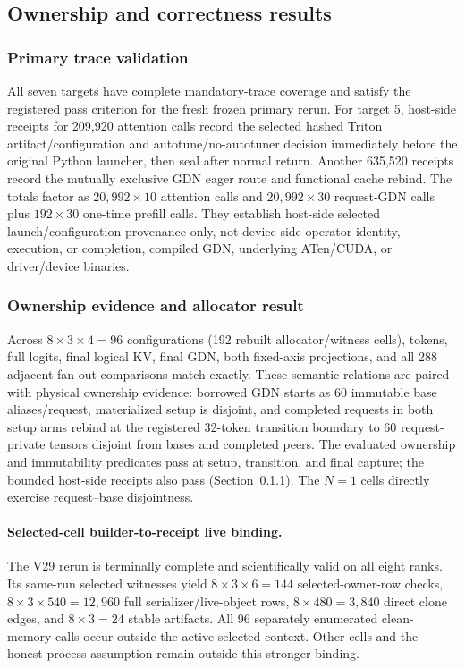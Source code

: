 \documentclass{article}
\begin{document}
\subsection{Ownership and correctness results}
\label{sec:results}

\subsubsection{Primary trace validation}
\label{sec:target-status}

All seven targets have complete mandatory-trace coverage and satisfy the
registered pass criterion for the fresh frozen primary rerun.  For target 5,
host-side receipts for 209,920 attention calls record the selected hashed
Triton artifact/configuration and autotune/no-autotuner decision immediately
before the original Python launcher, then seal after normal return.  Another
635,520 receipts record the mutually exclusive GDN eager route and functional
cache rebind.  The totals factor as $20{,}992\times10$ attention calls and
$20{,}992\times30$ request-GDN calls plus $192\times30$ one-time prefill calls.
They establish host-side selected launch/configuration provenance only, not
device-side operator identity, execution, or completion, compiled GDN,
underlying ATen/CUDA, or driver/device binaries.

\subsubsection{Ownership evidence and allocator result}

Across $8\times3\times4=96$ configurations (192 rebuilt allocator/witness
cells), tokens, full logits, final logical KV, final GDN, both fixed-axis
projections, and all 288 adjacent-fan-out comparisons match exactly.  These
semantic relations are paired with physical ownership evidence: borrowed GDN
starts as 60 immutable base aliases/request, materialized setup is disjoint,
and completed requests in both setup arms rebind at the registered 32-token
transition boundary to 60 request-private tensors disjoint from bases and
completed peers.  The evaluated
ownership and immutability predicates pass at setup, transition, and final
capture; the bounded host-side receipts also pass
(Section~\ref{sec:target-status}).  The $N=1$
cells directly exercise request--base disjointness.

\paragraph{Selected-cell builder-to-receipt live binding.}
The V29 rerun is terminally complete and scientifically valid on all eight
ranks.  Its same-run selected witnesses yield
$8\times3\times6=144$ selected-owner-row checks,
$8\times3\times540=12{,}960$ full serializer/live-object rows,
$8\times480=3{,}840$ direct clone edges, and $8\times3=24$ stable artifacts.
All 96 separately enumerated clean-memory calls occur outside the active
selected context.  Other cells and the honest-process assumption remain
outside this stronger binding.
\end{document}
